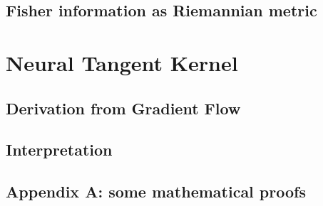 \documentclass[12pt, a4paper]{report}
\begin{document}
	\section{Fisher information as Riemannian metric}
	
	
	
	\chapter{Neural Tangent Kernel}
	\section{Derivation from Gradient Flow}
	
	\section{Interpretation}
	
	
	
	
	\nocite{*}
	\printbibliography[title=Literature]
	\begin{appendices}
		\chapter{Appendix A: some mathematical proofs}
		
	\end{appendices}
	
\end{document}
